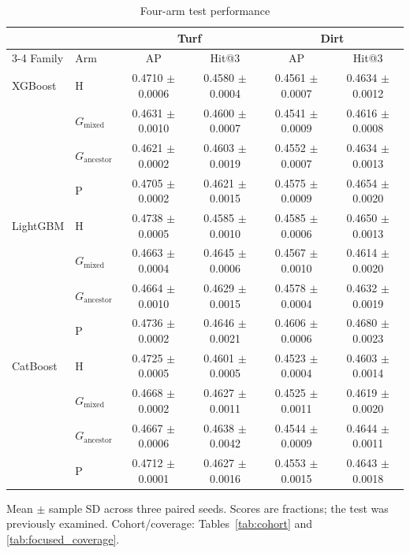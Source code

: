 \begin{table}[!t]
\caption{Four-arm test performance}
\label{tab:focused_scores}
\centering
\footnotesize
\setlength{\tabcolsep}{3pt}
\renewcommand{\arraystretch}{1.12}
\begin{tabular*}{\textwidth}{@{\extracolsep{\fill}}llcccc@{}}
\hline
& & \multicolumn{2}{c}{Turf} & \multicolumn{2}{c}{Dirt} \\
\cline{3-4}\cline{5-6}
Family & Arm & AP & Hit@3 & AP & Hit@3 \\
\hline
XGBoost & H & 0.4710 $\pm$ 0.0006 & 0.4580 $\pm$ 0.0004 & 0.4561 $\pm$ 0.0007 & 0.4634 $\pm$ 0.0012 \\
 & $G_{\mathrm{mixed}}$ & 0.4631 $\pm$ 0.0010 & 0.4600 $\pm$ 0.0007 & 0.4541 $\pm$ 0.0009 & 0.4616 $\pm$ 0.0008 \\
 & $G_{\mathrm{ancestor}}$ & 0.4621 $\pm$ 0.0002 & 0.4603 $\pm$ 0.0019 & 0.4552 $\pm$ 0.0007 & 0.4634 $\pm$ 0.0013 \\
 & P & 0.4705 $\pm$ 0.0002 & 0.4621 $\pm$ 0.0015 & 0.4575 $\pm$ 0.0009 & 0.4654 $\pm$ 0.0020 \\
\hline
LightGBM & H & 0.4738 $\pm$ 0.0005 & 0.4585 $\pm$ 0.0010 & 0.4585 $\pm$ 0.0006 & 0.4650 $\pm$ 0.0013 \\
 & $G_{\mathrm{mixed}}$ & 0.4663 $\pm$ 0.0004 & 0.4645 $\pm$ 0.0006 & 0.4567 $\pm$ 0.0010 & 0.4614 $\pm$ 0.0020 \\
 & $G_{\mathrm{ancestor}}$ & 0.4664 $\pm$ 0.0010 & 0.4629 $\pm$ 0.0015 & 0.4578 $\pm$ 0.0004 & 0.4632 $\pm$ 0.0019 \\
 & P & 0.4736 $\pm$ 0.0002 & 0.4646 $\pm$ 0.0021 & 0.4606 $\pm$ 0.0006 & 0.4680 $\pm$ 0.0023 \\
\hline
CatBoost & H & 0.4725 $\pm$ 0.0005 & 0.4601 $\pm$ 0.0005 & 0.4523 $\pm$ 0.0004 & 0.4603 $\pm$ 0.0014 \\
 & $G_{\mathrm{mixed}}$ & 0.4668 $\pm$ 0.0002 & 0.4627 $\pm$ 0.0011 & 0.4525 $\pm$ 0.0011 & 0.4619 $\pm$ 0.0020 \\
 & $G_{\mathrm{ancestor}}$ & 0.4667 $\pm$ 0.0006 & 0.4638 $\pm$ 0.0042 & 0.4544 $\pm$ 0.0009 & 0.4644 $\pm$ 0.0011 \\
 & P & 0.4712 $\pm$ 0.0001 & 0.4627 $\pm$ 0.0016 & 0.4553 $\pm$ 0.0015 & 0.4643 $\pm$ 0.0018 \\
\hline
\end{tabular*}
\par\smallskip\begin{minipage}{\textwidth}\footnotesize\raggedright Mean $\pm$ sample SD across three paired seeds. Scores are fractions; the test was previously examined. Cohort/coverage: Tables~\ref{tab:cohort} and \ref{tab:focused_coverage}.\end{minipage}
\end{table}
